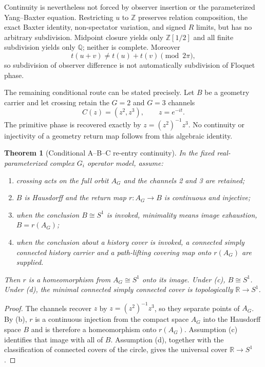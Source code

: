 \documentclass[11pt]{article}
\newtheorem{theorem}{Theorem}[section]
\theoremstyle{definition}
\theoremstyle{remark}
\begin{document}
Continuity is nevertheless not forced by observer insertion or the parameterized Yang--Baxter equation. Restricting $u$ to $\mathbb Z$ preserves relation composition, the exact Baxter identity, non-spectator variation, and signed $R$ limits, but has no arbitrary subdivision. Midpoint closure yields only $\mathbb Z[1/2]$ and all finite subdivision yields only $\mathbb Q$; neither is complete. Moreover
\begin{equation}
 t(u+v)\ne t(u)+t(v)\pmod{2\pi},
\end{equation}
so subdivision of observer difference is not automatically subdivision of Floquet phase.

The remaining conditional route can be stated precisely. Let $B$ be a geometry carrier and let crossing retain the $G=2$ and $G=3$ channels
\begin{equation}
 C(z)=(z^2,z^3),\qquad z=e^{-it}.
\end{equation}
The primitive phase is recovered exactly by $z=(z^2)^{-1}z^3$. No continuity or injectivity of a geometry return map follows from this algebraic identity.

\begin{theorem}[Conditional A--B--C re-entry continuity]\label{thm:reentry}
In the fixed real-parameterized complex $G_i$ operator model, assume:
\begin{enumerate}[label=(\alph*)]
 \item crossing acts on the full orbit $A_G$ and the channels 2 and 3 are retained;
 \item $B$ is Hausdorff and the return map $r:A_G\to B$ is continuous and injective;
 \item when the conclusion $B\cong S^1$ is invoked, \emph{minimality} means image exhaustion, $B=r(A_G)$;
 \item when the conclusion about a history cover is invoked, a connected simply connected history carrier and a path-lifting covering map onto $r(A_G)$ are supplied.
\end{enumerate}
Then $r$ is a homeomorphism from $A_G\cong S^1$ onto its image. Under (c), $B\cong S^1$. Under (d), the minimal connected simply connected cover is topologically $\mathbb R\to S^1$.
\end{theorem}

\begin{proof}
The channels recover $z$ by $z=(z^2)^{-1}z^3$, so they separate points of $A_G$. By (b), $r$ is a continuous injection from the compact space $A_G$ into the Hausdorff space $B$ and is therefore a homeomorphism onto $r(A_G)$. Assumption (c) identifies that image with all of $B$. Assumption (d), together with the classification of connected covers of the circle, gives the universal cover $\mathbb R\to S^1$.
\end{proof}
\end{document}
